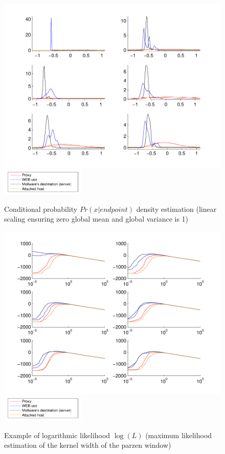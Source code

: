 \documentclass[a4paper]{IEEEtran}
\begin{document}
\begin{figure}[t!]%
  \centering
  \includegraphics[width=140mm]{dens_src_logp}
  \includegraphics[width=40mm]{legend}
  \caption{Conditional probability $Pr(x|endpoint)$ density estimation (linear scaling ensuring zero global mean and global variance is 1)}
  \label{fig:dens_src_logp}
\end{figure}
\begin{figure}[t!]%
  \centering
  \includegraphics[width=140mm]{loglik_src_bdivp}
  \includegraphics[width=40mm]{legend}
    \caption{Example of logarithmic likelihood $\log(L)$ (maximum likelihood estimation of the kernel width of the parzen window)}
  \label{fig:loglik_src_bdivp}
\end{figure}
\end{document}
